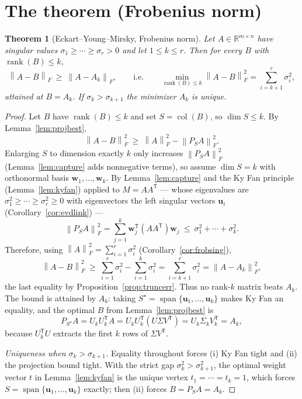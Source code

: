 \documentclass[11pt,oneside]{book}
\theoremstyle{plain}
\newtheorem{theorem}{Theorem}[chapter]
\theoremstyle{definition}
\theoremstyle{remark}
\newcommand{\R}{\mathbb{R}}
\newcommand{\rank}{\operatorname{rank}}
\newcommand{\col}{\operatorname{col}}
\newcommand{\spn}{\operatorname{span}}
\newcommand{\dimm}{\operatorname{dim}}
\newcommand{\norm}[1]{\left\lVert #1 \right\rVert}
\newcommand{\fn}[1]{\norm{#1}_F}
\newcommand{\T}{^{\mathsf T}}
\newcommand{\bu}{\mathbf{u}}
\newcommand{\bw}{\mathbf{w}}
\begin{document}
\section{The theorem (Frobenius norm)}

\begin{theorem}[Eckart--Young--Mirsky, Frobenius norm]\label{thm:eyf}
Let $A\in\R^{m\times n}$ have singular values $\sigma_1\ge\cdots\ge\sigma_r>0$ and let
$1\le k\le r$. Then for every $B$ with $\rank(B)\le k$,
\[
\fn{A-B}\ \ge\ \fn{A-A_k},\qquad\text{i.e.}\qquad
\min_{\rank(B)\le k}\fn{A-B}^2=\sum_{i=k+1}^{r}\sigma_i^2 ,
\]
attained at $B=A_k$. If $\sigma_k>\sigma_{k+1}$ the minimizer $A_k$ is unique.
\end{theorem}
\begin{proof}
Let $B$ have $\rank(B)\le k$ and set $S=\col(B)$, so $\dimm S\le k$. By
Lemma~\ref{lem:projbest},
\[
\fn{A-B}^2\ \ge\ \fn{A}^2-\fn{P_SA}^2 .
\]
Enlarging $S$ to dimension exactly $k$ only increases $\fn{P_SA}^2$
(Lemma~\ref{lem:capture} adds nonnegative terms), so assume $\dimm S=k$ with orthonormal
basis $\bw_1,\dots,\bw_k$. By Lemma~\ref{lem:capture} and the Ky Fan principle
(Lemma~\ref{lem:kyfan}) applied to $M=AA\T$ --- whose eigenvalues are
$\sigma_1^2\ge\cdots\ge\sigma_r^2\ge0$ with eigenvectors the left singular vectors $\bu_i$
(Corollary~\ref{cor:evdlink}) ---
\[
\fn{P_SA}^2=\sum_{j=1}^k\bw_j\T(AA\T)\bw_j\ \le\ \sigma_1^2+\cdots+\sigma_k^2 .
\]
Therefore, using $\fn{A}^2=\sum_{i=1}^r\sigma_i^2$ (Corollary~\ref{cor:frobsing}),
\[
\fn{A-B}^2\ \ge\ \sum_{i=1}^r\sigma_i^2-\sum_{i=1}^k\sigma_i^2=\sum_{i=k+1}^r\sigma_i^2
=\fn{A-A_k}^2 ,
\]
the last equality by Proposition~\ref{prop:truncerr}. Thus no rank-$k$ matrix beats
$A_k$. The bound is attained by $A_k$: taking
$S^\star=\spn\{\bu_1,\dots,\bu_k\}$ makes Ky Fan an equality, and the optimal $B$ from
Lemma~\ref{lem:projbest} is
\[
P_{S^\star}A=U_kU_k\T A=U_kU_k\T(U\Sigma V\T)=U_k\Sigma_k V_k\T=A_k,
\]
because $U_k\T U$ extracts the first $k$ rows of $\Sigma V\T$.

\emph{Uniqueness when $\sigma_k>\sigma_{k+1}$.} Equality throughout forces (i) Ky Fan
tight and (ii) the projection bound tight. With the strict gap
$\sigma_k^2>\sigma_{k+1}^2$, the optimal weight vector $t$ in Lemma~\ref{lem:kyfan} is the
unique vertex $t_1=\cdots=t_k=1$, which forces $S=\spn\{\bu_1,\dots,\bu_k\}$ exactly;
then (ii) forces $B=P_SA=A_k$.
\end{proof}
\end{document}
